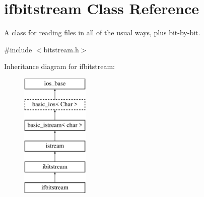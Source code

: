 \hypertarget{classifbitstream}{}\section{ifbitstream Class Reference}
\label{classifbitstream}


A class for reading files in all of the usual ways, plus bit-\/by-\/bit.  




{\ttfamily \#include $<$bitstream.\+h$>$}

Inheritance diagram for ifbitstream\+:\begin{figure}[H]
\begin{center}
\leavevmode
\includegraphics[height=6.000000cm]{classifbitstream}
\end{center}
\end{figure}
